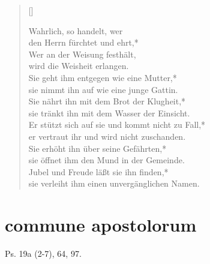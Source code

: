 
\begin{verse}[\versewidth]

Wahrlich, so handelt, wer \\den Herrn fürchtet und ehrt,*\\
Wer an der Weisung festhält,\\
wird die Weisheit erlangen.\\
\vin Sie geht ihm entgegen wie eine Mutter,*\\
\vin sie nimmt ihn auf wie eine junge Gattin.\\
Sie nährt ihn mit dem Brot der Klugheit,*\\
sie tränkt ihn mit dem Wasser der Einsicht.\\
\vin Er stützt sich auf sie und kommt nicht zu Fall,*\\
\vin er vertraut ihr und wird nicht zuschanden.\\
Sie erhöht ihn über seine Gefährten,*\\
sie öffnet ihm den Mund in der Gemeinde.\\
\vin Jubel und Freude läßt sie ihn finden,*\\
\vin sie verleiht ihm einen unvergänglichen Namen.\\
\end{verse}


\section{commune apostolorum}

Ps. 19a (2-7), 64, 97.\\




